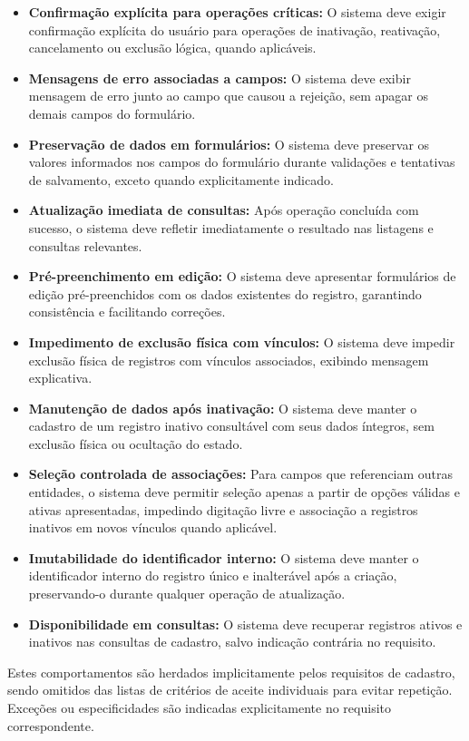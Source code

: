 \begin{itemize}[leftmargin=0.6cm]
    \item \textbf{Confirmação explícita para operações críticas:} O sistema deve exigir confirmação explícita do usuário para operações de inativação, reativação, cancelamento ou exclusão lógica, quando aplicáveis.
    \item \textbf{Mensagens de erro associadas a campos:} O sistema deve exibir mensagem de erro junto ao campo que causou a rejeição, sem apagar os demais campos do formulário.
    \item \textbf{Preservação de dados em formulários:} O sistema deve preservar os valores informados nos campos do formulário durante validações e tentativas de salvamento, exceto quando explicitamente indicado.
    \item \textbf{Atualização imediata de consultas:} Após operação concluída com sucesso, o sistema deve refletir imediatamente o resultado nas listagens e consultas relevantes.
    \item \textbf{Pré-preenchimento em edição:} O sistema deve apresentar formulários de edição pré-preenchidos com os dados existentes do registro, garantindo consistência e facilitando correções.
    \item \textbf{Impedimento de exclusão física com vínculos:} O sistema deve impedir exclusão física de registros com vínculos associados, exibindo mensagem explicativa.
    \item \textbf{Manutenção de dados após inativação:} O sistema deve manter o cadastro de um registro inativo consultável com seus dados íntegros, sem exclusão física ou ocultação do estado.
    \item \textbf{Seleção controlada de associações:} Para campos que referenciam outras entidades, o sistema deve permitir seleção apenas a partir de opções válidas e ativas apresentadas, impedindo digitação livre e associação a registros inativos em novos vínculos quando aplicável.
    \item \textbf{Imutabilidade do identificador interno:} O sistema deve manter o identificador interno do registro único e inalterável após a criação, preservando-o durante qualquer operação de atualização.
    \item \textbf{Disponibilidade em consultas:} O sistema deve recuperar registros ativos e inativos nas consultas de cadastro, salvo indicação contrária no requisito.
\end{itemize}

Estes comportamentos são herdados implicitamente pelos requisitos de cadastro, sendo omitidos das listas de critérios de aceite individuais para evitar repetição. Exceções ou especificidades são indicadas explicitamente no requisito correspondente.

